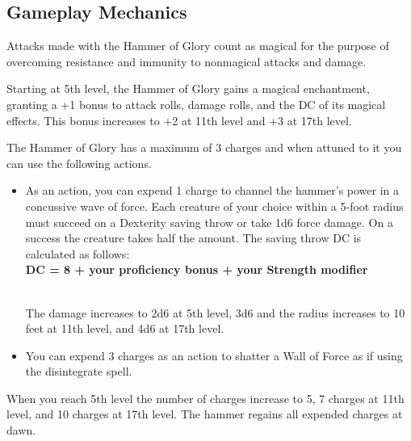 \subsection*{Gameplay Mechanics}
{\entryfont Attacks made with the Hammer of Glory count as magical for the purpose of overcoming resistance and immunity to nonmagical attacks and damage.

Starting at 5th level, the Hammer of Glory gains a magical enchantment, granting a +1 bonus to attack rolls, damage rolls, and the DC of its magical effects. This bonus increases to +2 at 11th level and +3 at 17th level.

The Hammer of Glory has a maximum of 3 charges and when attuned to it you can use the following actions.
\begin{itemize}
	\item As an action, you can expend 1 charge to channel the hammer's power in a concussive wave of force. Each creature of your choice within a 5-foot radius must succeed on a Dexterity saving throw or take 1d6 force damage. On a success the creature takes half the amount. The saving throw DC is calculated as follows:\\

	{\centering\textbf{DC = 8 + your proficiency bonus + your Strength modifier}}

	\hfill\\The damage increases to 2d6 at 5th level, 3d6 and the radius increases to 10 feet at 11th level, and 4d6 at 17th level.

	\item You can expend 3 charges as an action to shatter a Wall of Force as if using the disintegrate spell.
\end{itemize}
\noindent When you reach 5th level the number of charges increase to 5, 7 charges at 11th level, and 10 charges at 17th level. The hammer regains all expended charges at dawn.}